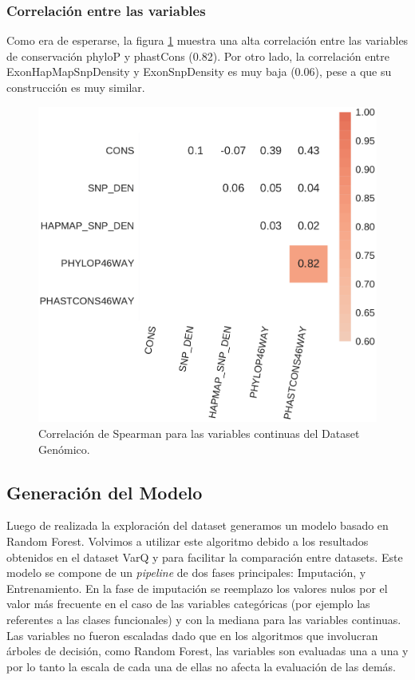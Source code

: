\subsubsection{Correlación entre las variables}

Como era de esperarse, la figura \ref{fig:corrplot_genomic} muestra una alta correlación entre las variables de conservación phyloP y phastCons (0.82). Por otro lado, la correlación entre ExonHapMapSnpDensity y ExonSnpDensity es muy baja (0.06), pese a que su construcción es muy similar.

\begin{figure}[H]
    \centering
    \includegraphics[scale=0.5]{documents/latex/figures/3/genomic/genomic_corr.pdf}
    \caption{Correlación de Spearman para las variables continuas del Dataset Genómico.}
    \label{fig:corrplot_genomic}
\end{figure}


\subsection{Generación del Modelo}

Luego de realizada la exploración del dataset generamos un modelo basado en Random Forest. Volvimos a utilizar este algoritmo debido a los resultados obtenidos en el dataset VarQ y para facilitar la comparación entre datasets. Este modelo se compone de un \textit{pipeline} de dos fases principales: Imputación, y Entrenamiento. En la fase de imputación se reemplazo los valores nulos por el valor más frecuente en el caso de las variables categóricas (por ejemplo las referentes a las clases funcionales) y con la mediana para las variables continuas. Las variables no fueron escaladas dado que en los algoritmos que involucran árboles de decisión, como Random Forest, las variables son evaluadas una a una y por lo tanto la escala de cada una de ellas no afecta la evaluación de las demás.

